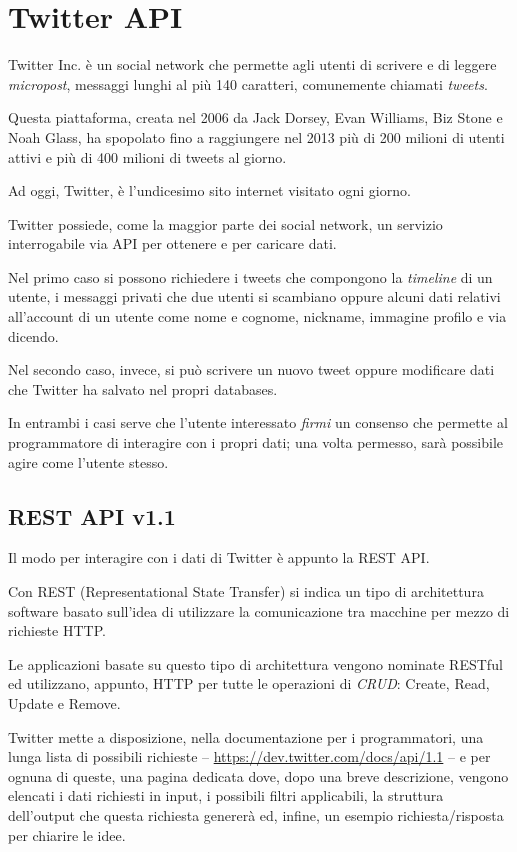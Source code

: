 \section{Twitter API}
	Twitter Inc. è un social network che permette agli utenti di scrivere e di leggere \emph{micropost}, messaggi lunghi al più 140 caratteri, comunemente chiamati \emph{tweets}. 

	Questa piattaforma, creata nel 2006 da Jack Dorsey, Evan Williams, Biz Stone e Noah Glass, ha spopolato fino a raggiungere nel 2013 più di 200 milioni di utenti attivi e più di 400 milioni di tweets al giorno\cite{twitter_data}.

	Ad oggi, Twitter, è l'undicesimo sito internet visitato ogni giorno\cite{twitter_alexa}.

	Twitter possiede, come la maggior parte dei social network, un servizio interrogabile via API per ottenere e per caricare dati.

	Nel primo caso si possono richiedere i tweets che compongono la \emph{timeline} di un utente, i messaggi privati che due utenti si scambiano oppure alcuni dati relativi all'account di un utente come nome e cognome, nickname, immagine profilo e via dicendo.

	Nel secondo caso, invece, si può scrivere un nuovo tweet oppure modificare dati che Twitter ha salvato nel propri databases. 

	In entrambi i casi serve che l'utente interessato \emph{firmi} un consenso che permette al programmatore di interagire con i propri dati; una volta permesso, sarà possibile agire come l'utente stesso. 

	\subsection{REST API v1.1}
		Il modo per interagire con i dati di Twitter è appunto la REST API. 
	
		Con REST (Representational State Transfer) si indica un tipo di architettura software basato sull'idea di utilizzare la comunicazione tra macchine per mezzo di richieste HTTP.

		Le applicazioni basate su questo tipo di architettura vengono nominate RESTful ed utilizzano, appunto, HTTP per tutte le operazioni di \emph{CRUD}: Create, Read, Update e Remove.

		Twitter mette a disposizione, nella documentazione per i programmatori\cite{twitter_doc}, una lunga lista di possibili richieste -- \url{https://dev.twitter.com/docs/api/1.1} -- e per ognuna di queste, una pagina dedicata dove, dopo una breve descrizione, vengono elencati i dati richiesti in input, i possibili filtri applicabili, la struttura dell'output che questa richiesta genererà ed, infine, un esempio richiesta/risposta per chiarire le idee.


